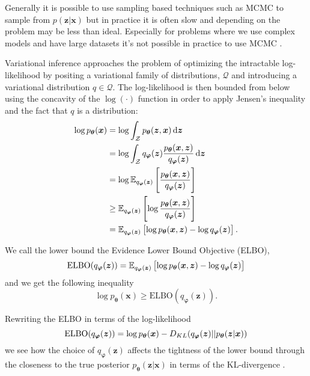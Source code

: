 Generally it is possible to use sampling based techniques such as MCMC
\cite{brooks2011handbook} to sample from $p(\bm{z} | \bm{x})$ but in practice it is
often slow and depending on the problem may be less than ideal. Especially for
problems where we use complex models and have large datasets it's not possible
in practice to use MCMC \cite{blei_variational_2017}.

Variational inference approaches the problem of optimizing the intractable
log-likelihood by positing a variational family of distributions,
$\mathcal{Q}$ and introducing a variational distribution $q \in \mathcal{Q}$. The
log-likelihood is then bounded from below using the concavity of the
$\log( \cdot )$ function in order to apply Jensen's inequality and the fact that
$q$ is a distribution:
\begin{align*}
  \log p_{\bm{\theta}}(\bm{x}) & = \log \int_{\mathcal{Z}} p_{\bm{\theta}}(\bm{z}, \bm{x}) \dif \bm{z}\\
                               & = \log \int_{\mathcal{Z}}q_{\bm{\varphi}}(\bm{z})  \frac{p_{\bm{\theta}}(\bm{x}, \bm{z})}{q_{\bm{\varphi}}(\bm{z})} \dif \bm{z} \\
                               & = \log \E_{q_{\bm{\varphi}}(\bm{z})}\left[\frac{p_{\bm{\theta}}(\bm{x}, \bm{z})}{q_{\bm{\varphi}}(\bm{z})}\right] \\
                               & \geq \E_{q_{\bm{\varphi}}(\bm{z})}\left[\log \frac{p_{\bm{\theta}}(\bm{x}, \bm{z})}{q_{\bm{\varphi}}(\bm{z})}\right] \\
                               & = \E_{q_{\bm{\varphi}}(\bm{z})}\left[\log p_{\bm{\theta}}(\bm{x}, \bm{z}) - \log q_{\bm{\varphi}}(\bm{z})\right].
\end{align*}

We call the lower bound the Evidence Lower Bound Objective (ELBO),
\begin{equation}
  \label{eq:ELBO}
  \text{ELBO}(q_{\bm{\varphi}}(\bm{z})) =
  \operatorname{\mathbb{E}}_{q_{\bm{\varphi}}(\bm{z})}\left[ \log p_{\bm{\theta}}(\bm{x}, \bm{z}) - \log
    q_{\bm{\varphi}}(\bm{z}) \right]
\end{equation}
and we get the following inequality
\begin{equation}
  \label{eq:ELBO_inequality}
  \log p_{\bm{\theta}}(\bm{x}) \geq \text{ELBO}(q_{\bm{\varphi}}(\bm{z})).
\end{equation}

Rewriting the ELBO in terms of the log-likelihood
\begin{equation}
  \label{eq:ELBO_decomposed}
  \text{ELBO}(q_{\bm{\varphi}}(\bm{z})) = \log p_{\bm{\theta}}(\bm{x}) - D_{KL}(q_{\bm{\varphi}}(\bm{z}) || p_{\bm{\theta}}(\bm{z} | \bm{x}))
\end{equation}
we see how the choice of $q_{\bm{\varphi}}(\bm{z})$ affects the tightness of the
lower bound through the closeness to the true posterior $p_{\bm{\theta}}(\bm{z}
| \bm{x})$ in terms of the KL-divergence \cite{blei_variational_2017}.

